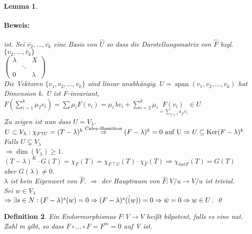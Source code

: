 \documentclass{report}
\newcommand{\lb}{\lambda}
\DeclareMathOperator{\Span}{span}
\DeclareMathOperator{\Ker}{Ker}
\theoremstyle{customrem}
\theoremstyle{customdef}
\newtheorem{definition}{Definition}[chapter]
\newtheorem{lemma}[definition]{Lemma}
\renewenvironment{proof}{\paragraph{Beweis: }}{\qed}
\theoremstyle{customenv}
\begin{document}
\begin{lemma}
\begin{proof}
  \)
  ist. Sei \(\bar{v_2}, \dots, \bar{v_k}\) eine Basis von \(\hat{U}\) so dass 
  die Darstellungsmatrix von \(\hat{F}\) bzgl. \(\{v_2, \dots, \bar{v}_k\}\)\\
  \(
      \begin{pmatrix}
        \lb &        & X\\
            & \ddots & \\
        0   &        & \lb
      \end{pmatrix}
  \)\\
  Die Vektoren \(\{v_1, v_2, \dots, v_k\}\) sind linear unabh\"angig.
  \(U = \Span(v_1, v_2, \dots, v_k)\) hat Dimension k. U ist F-invariant,
  \(
    F(\sum_{i=1}^k \mu_I v_i)
    = \sum \mu_i F(v_i)
    = \mu_i \lb v_i + \sum_{i=2}^k \mu_i \underset{=\sum_{j\le i} a_{ji}v_i}{F(v_i)}
    \in U
  \)\\
  Zu zeigen ist nun dass \(U = V_\lb\).
  \(
    U \subset V_\lb:
    \chi_{F \uparrow U} = (T - \lb)^k
    \overset{\text{Caley-Hamilton}}{\Rightarrow} (F - \lb)^k = 0 \text{ auf U}\\
    \Rightarrow U \subseteq \Ker(F - \lb)^k\\
    \)
    Falls \(U \subsetneq V_\lb\)\\
    \(\Rightarrow \dim(V_\lb) \ge 1\).\\
    \(
      (T-\lb)^K \cdot G(T) = \chi_F(T) = \chi_{F\uparrow U}(T) \cdot \chi_{\hat{F}}(T)
      \Rightarrow \chi_{hat{F}}(T) = G(T)
    \) aber \(G(\lb) \neq 0\).\\
    \(\lb \) ist kein Eigenwert von \(\hat{F}\).
    \(\Rightarrow\) der Hauptraum von \(\hat{F}: V/u \to V/u\) ist trivial.\\
    Sei \(w \in V_\lb\)\\
    \(\Rightarrow \exists s \in N : (F - \lb)^s(w) = 0 \Rightarrow (F - \lb)^s(\bar(w)) = 0\\
    \Rightarrow \bar{w} = 0 \Rightarrow w \in U\).
  \end{proof}
\end{lemma}

\begin{definition}
  Ein Endormorphismus \(F : V \to V\) hei\ss{}t bilpotent, falls es eine nat.
  Zahl m gibt, so dass \(F \circ \dots \circ F = F^m = 0\) auf V ist.
\end{definition}
\end{document}
